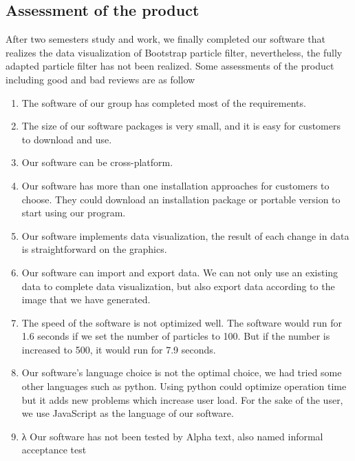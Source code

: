 \documentclass[11pt,oneside,a4paper]{article}
\begin{document}
\subsection{Assessment of the product}
After two semesters\’ study and work, we finally completed our software that realizes the data visualization of Bootstrap particle filter, nevertheless, the fully adapted particle filter has not been realized. Some assessments of the product including good and bad reviews are as follow
\begin{enumerate}
  \item The software of our group has completed most of the requirements.
  \item The size of our software packages is very small, and it is easy for customers to download and use.
  \item Our software can be cross-platform.
  \item Our software has more than one installation approaches for customers to choose. They could download an installation package or portable version to start using our program.
  \item Our software implements data visualization, the result of each change in data is straightforward on the graphics.
  \item Our software can import and export data. We can not only use an existing data to complete data visualization, but also export data according to the image that we have generated.
  \item The speed of the software is not optimized well. The software would run for 1.6 seconds if we set the number of particles to 100. But if the number is increased to 500, it would run for 7.9 seconds.
  \item Our software’s language choice is not the optimal choice, we had tried some other languages such as python. Using python could optimize operation time but it adds new problems which increase user load. For the sake of the user, we use JavaScript as the language of our software.
  \item λ	Our software has not been tested by Alpha text, also named informal acceptance test
\end{enumerate}
\end{document}
